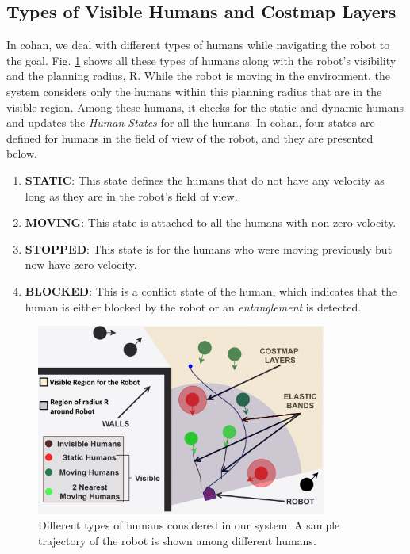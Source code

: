 \subsection{Types of Visible Humans and Costmap Layers}
In \acrshort{cohan}, we deal with different types of humans while navigating the robot to the goal. Fig. \ref{fig:human_types} shows all these types of humans along with the robot's visibility and the planning radius, R. While the robot is moving in the environment, the system considers only the humans within this planning radius that are in the visible region. Among these humans, it checks for the static and dynamic humans and updates the \textit{Human States} for all the humans. In \acrshort{cohan}, four states are defined for humans in the field of view of the robot, and they are presented below.
\begin{enumerate}
    \item \textbf{STATIC}: This state defines the humans that do not have any velocity as long as they are in the robot's field of view.
    \item \textbf{MOVING}: This state is attached to all the humans with non-zero velocity.
    \item \textbf{STOPPED}: This state is for the humans who were moving previously but now have zero velocity.
    \item \textbf{BLOCKED}: This is a conflict state of the human, which indicates that the human is either blocked by the robot or an \textit{entanglement} is detected.
\end{enumerate}

\begin{figure}[h!]
    \centering
    \includegraphics[width=0.85\textwidth]{images/chapter4/human_types.png}
    \caption{Different types of humans considered in our system. A sample trajectory of the robot is shown among different humans.}
    \label{fig:human_types}
\end{figure}

